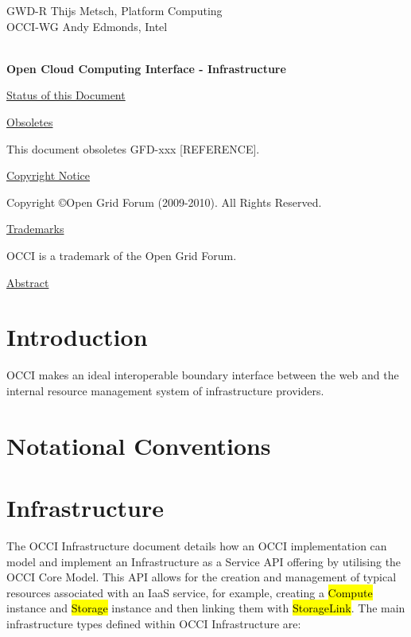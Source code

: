 \documentclass[10pt,a4paper]{article}
\begin{document}
\thispagestyle{empty}

GWD-R \hfill  Thijs Metsch, Platform Computing\\
OCCI-WG \hfill  Andy Edmonds, Intel\\
\\

\vspace*{0.5in}

\begin{Large}
\textbf{Open Cloud Computing Interface - Infrastructure}
\end{Large}

\vspace*{0.5in}

\underline{Status of this Document}



\underline{Obsoletes}

This document obsoletes GFD-xxx [REFERENCE].

\underline{Copyright Notice}

Copyright \copyright Open Grid Forum (2009-2010). All Rights Reserved.

\underline{Trademarks}

OCCI is a trademark of the Open Grid Forum.

\underline{Abstract}



\newpage
\tableofcontents
\newpage

\section{Introduction}


OCCI makes an ideal interoperable boundary interface between the web and the
internal resource management system of infrastructure providers.

\section{Notational Conventions}



\section{Infrastructure}
The OCCI Infrastructure document details how an OCCI implementation can model and implement an
Infrastructure as a Service API offering by utilising the OCCI Core Model. This API allows for the creation and management of typical resources associated with an IaaS service, for example, creating a \hl{Compute} instance and \hl{Storage} instance and then linking them with \hl{StorageLink}. The main infrastructure types defined within OCCI Infrastructure are:
\end{document}
